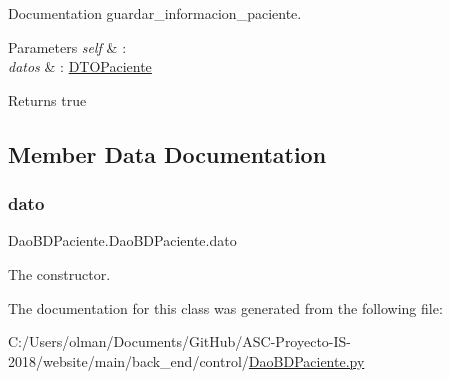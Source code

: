 Documentation guardar\+\_\+informacion\+\_\+paciente. 


\begin{DoxyParams}{Parameters}
{\em self} & \+: \\
\hline
{\em datos} & \+: \mbox{\hyperlink{namespace_d_t_o_paciente}{D\+T\+O\+Paciente}} \\
\hline
\end{DoxyParams}
\begin{DoxyReturn}{Returns}
true 
\end{DoxyReturn}


\subsection{Member Data Documentation}
\mbox{\label{class_dao_b_d_paciente_1_1_dao_b_d_paciente_ad7ab0cc34e82d6fad753aeaee971f86a}} 
\subsubsection{\texorpdfstring{dato}{dato}}
{\footnotesize\ttfamily Dao\+B\+D\+Paciente.\+Dao\+B\+D\+Paciente.\+dato}



The constructor. 



The documentation for this class was generated from the following file\+:\begin{DoxyCompactItemize}
\item 
C\+:/\+Users/olman/\+Documents/\+Git\+Hub/\+A\+S\+C-\/\+Proyecto-\/\+I\+S-\/2018/website/main/back\+\_\+end/control/\mbox{\hyperlink{_dao_b_d_paciente_8py}{Dao\+B\+D\+Paciente.\+py}}\end{DoxyCompactItemize}
